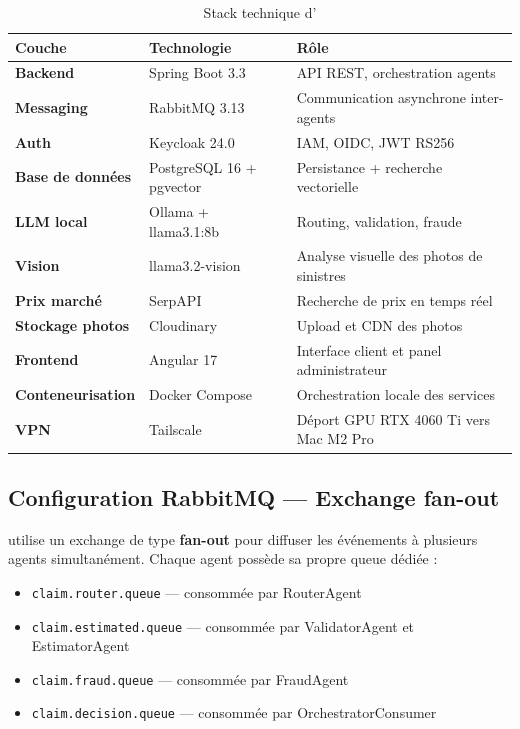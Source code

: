 \begin{table}[H]
\centering
\caption{Stack technique d'\insureflow{}}
\begin{tabularx}{\textwidth}{>{\bfseries}llX}
\toprule
Couche           & Technologie          & Rôle \\
\midrule
Backend          & Spring Boot 3.3      & API REST, orchestration agents \\
Messaging        & RabbitMQ 3.13        & Communication asynchrone inter-agents \\
Auth             & Keycloak 24.0        & IAM, OIDC, JWT RS256 \\
Base de données  & PostgreSQL 16 + pgvector & Persistance + recherche vectorielle \\
LLM local        & Ollama + llama3.1:8b & Routing, validation, fraude \\
Vision           & llama3.2-vision      & Analyse visuelle des photos de sinistres \\
Prix marché      & SerpAPI              & Recherche de prix en temps réel \\
Stockage photos  & Cloudinary           & Upload et CDN des photos \\
Frontend         & Angular 17           & Interface client et panel administrateur \\
Conteneurisation & Docker Compose       & Orchestration locale des services \\
VPN              & Tailscale            & Déport GPU RTX 4060 Ti vers Mac M2 Pro \\
\bottomrule
\end{tabularx}
\label{tab:stack}
\end{table}

\subsection{Configuration RabbitMQ — Exchange fan-out}

\insureflow{} utilise un exchange de type \textbf{fan-out} pour diffuser les
événements à plusieurs agents simultanément. Chaque agent possède sa propre queue
dédiée :

\begin{itemize}
  \item \texttt{claim.router.queue} — consommée par RouterAgent
  \item \texttt{claim.estimated.queue} — consommée par ValidatorAgent et EstimatorAgent
  \item \texttt{claim.fraud.queue} — consommée par FraudAgent
  \item \texttt{claim.decision.queue} — consommée par OrchestratorConsumer
\end{itemize}

